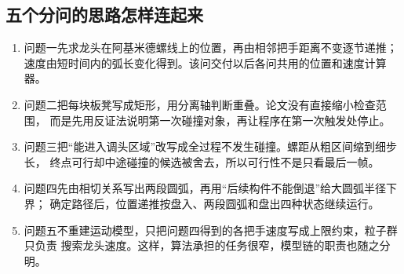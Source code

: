 \subsection{五个分问的思路怎样连起来}

\begin{enumerate}
  \item 问题一先求龙头在阿基米德螺线上的位置，再由相邻把手距离不变逐节递推；
  速度由短时间内的弧长变化得到。该问交付以后各问共用的位置和速度计算器。
  \item 问题二把每块板凳写成矩形，用分离轴判断重叠。论文没有直接缩小检查范围，
  而是先用反证法说明第一次碰撞对象，再让程序在第一次触发处停止。
  \item 问题三把“能进入调头区域”改写成全过程不发生碰撞。螺距从粗区间缩到细步长，
  终点可行却中途碰撞的候选被舍去，所以可行性不是只看最后一帧。
  \item 问题四先由相切关系写出两段圆弧，再用“后续构件不能倒退”给大圆弧半径下界；
  确定路径后，位置递推按盘入、两段圆弧和盘出四种状态继续运行。
  \item 问题五不重建运动模型，只把问题四得到的各把手速度写成上限约束，粒子群只负责
  搜索龙头速度。这样，算法承担的任务很窄，模型链的职责也随之分明。
\end{enumerate}

